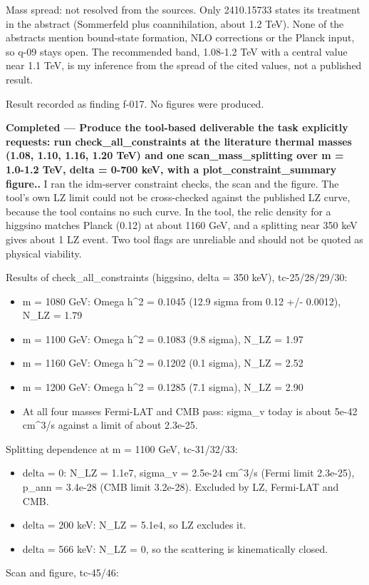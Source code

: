 \documentclass[11pt,a4paper]{article}
\begin{document}
Mass spread: not resolved from the sources. Only 2410.15733 states its treatment in the abstract (Sommerfeld plus coannihilation, about 1.2 TeV). None of the abstracts mention bound-state formation, NLO corrections or the Planck input, so q-09 stays open. The recommended band, 1.08-1.2 TeV with a central value near 1.1 TeV, is my inference from the spread of the cited values, not a published result.

Result recorded as finding f-017. No figures were produced.

\textbf{Completed --- Produce the tool-based deliverable the task explicitly requests: run check\_all\_constraints at the literature thermal masses (1.08, 1.10, 1.16, 1.20 TeV) and one scan\_mass\_splitting over m = 1.0-1.2 TeV, delta = 0-700 keV, with a plot\_constraint\_summary figure..} I ran the idm-server constraint checks, the scan and the figure. The tool's own LZ limit could not be cross-checked against the published LZ curve, because the tool contains no such curve. In the tool, the relic density for a higgsino matches Planck (0.12) at about 1160 GeV, and a splitting near 350 keV gives about 1 LZ event. Two tool flags are unreliable and should not be quoted as physical viability.

Results of check\_all\_constraints (higgsino, delta = 350 keV), tc-25/28/29/30:

\begin{itemize}
  \item m = 1080 GeV: Omega h\textasciicircum{}2 = 0.1045 (12.9 sigma from 0.12 +/- 0.0012), N\_LZ = 1.79
  \item m = 1100 GeV: Omega h\textasciicircum{}2 = 0.1083 (9.8 sigma), N\_LZ = 1.97
  \item m = 1160 GeV: Omega h\textasciicircum{}2 = 0.1202 (0.1 sigma), N\_LZ = 2.52
  \item m = 1200 GeV: Omega h\textasciicircum{}2 = 0.1285 (7.1 sigma), N\_LZ = 2.90
  \item At all four masses Fermi-LAT and CMB pass: sigma\_v today is about 5e-42 cm\textasciicircum{}3/s against a limit of about 2.3e-25.
\end{itemize}
Splitting dependence at m = 1100 GeV, tc-31/32/33:

\begin{itemize}
  \item delta = 0: N\_LZ = 1.1e7, sigma\_v = 2.5e-24 cm\textasciicircum{}3/s (Fermi limit 2.3e-25), p\_ann = 3.4e-28 (CMB limit 3.2e-28). Excluded by LZ, Fermi-LAT and CMB.
  \item delta = 200 keV: N\_LZ = 5.1e4, so LZ excludes it.
  \item delta = 566 keV: N\_LZ = 0, so the scattering is kinematically closed.
\end{itemize}
Scan and figure, tc-45/46:
\end{document}
